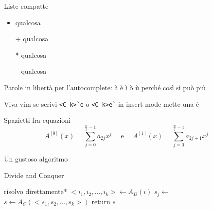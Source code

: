 Liste compatte
\begin{itemize}[noitemsep,topsep=0pt,parsep=0pt,partopsep=0pt]
    \item qualcosa
    \item[+] qualcosa
    \item[*] qualcosa
    \item[--] qualcosa
\end{itemize}

Parole in libertà per l'autocomplete: 
à
è
ì
ò
ù
perché
così
sì
può
più

Viva vim se scrivi \verb|<C-k>`e| o \verb|<C-k>e`| in insert mode mette una è


Spazietti fra equazioni
\begin{equation*}
    A^{[0]}(x) = \sum_{j=0}^{\frac{n}{2}-1} a_{2j}x^j
    \quad \text{ e } \quad
    A^{[1]}(x) = \sum_{j=0}^{\frac{n}{2}-1} a_{2j+1}x^j
\end{equation*}

Un gustoso algoritmo
\begin{algorithm}[H]
\caption{Divide and Conquer}\label{alg:dncmock}
\begin{algorithmic}[1]
                                     
            \State *risolvo direttamente*
        \EndIf
        \State $<i_1, i_2, \dots, i_k> \gets A_D(i)$    
                            
            \State $s_j \gets $ 
        \EndFor
        \State $s \gets A_C(<s_1, s_2, \dots, s_k>)$    
        \State return $s$
    \EndProcedure
\end{algorithmic}
\end{algorithm}


